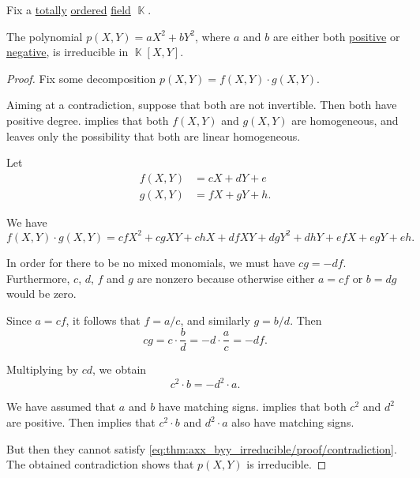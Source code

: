 \begin{proposition}\label{thm:axx_byy_irreducible}
  Fix a \hyperref[def:totally_ordered_set]{totally} \hyperref[def:ordered_ring]{ordered} \hyperref[def:field]{field} \( \BbbK \).

  The polynomial \( p(X, Y) = a X^2 + b Y^2 \), where \( a \) and \( b \) are either both \hyperref[def:ordered_semiring_positivity]{positive} or \hyperref[def:ordered_semiring_positivity]{negative}, is irreducible in \( \BbbK[X, Y] \).
\end{proposition}
\begin{proof}
  Fix some decomposition \( p(X, Y) = f(X, Y) \cdot g(X, Y) \).

  Aiming at a contradiction, suppose that both are not invertible. Then both have positive degree.  implies that both \( f(X, Y) \) and \( g(X, Y) \) are homogeneous, and  leaves only the possibility that both are linear homogeneous.

  Let
  \begin{align*}
    f(X, Y) &= c X + d Y + e \\
    g(X, Y) &= f X + g Y + h.
  \end{align*}

  We have
  \begin{equation*}
    f(X, Y) \cdot g(X, Y) = c f X^2 + c g X Y + c h X + d f X Y + d g Y^2 + d h Y + e f X + e g Y + e h.
  \end{equation*}

  In order for there to be no mixed monomials, we must have \( c g = - d f \). Furthermore, \( c \), \( d \), \( f \) and \( g \) are nonzero because otherwise either \( a = c f \) or \( b = d g \) would be zero.

  Since \( a = c f \), it follows that \( f = a / c \), and similarly \( g = b / d \). Then
  \begin{equation*}
    c g = c \cdot \frac b d = - d \cdot \frac a c = - d f.
  \end{equation*}

  Multiplying by \( cd \), we obtain
  \begin{equation}\label{eq:thm:axx_byy_irreducible/proof/contradiction}
    c^2 \cdot b = - d^2 \cdot a.
  \end{equation}

  We have assumed that \( a \) and \( b \) have matching signs.  implies that both \( c^2 \) and \( d^2 \) are positive. Then  implies that \( c^2 \cdot b \) and \( d^2 \cdot a \) also have matching signs.

  But then they cannot satisfy \eqref{eq:thm:axx_byy_irreducible/proof/contradiction}. The obtained contradiction shows that \( p(X, Y) \) is irreducible.
\end{proof}


